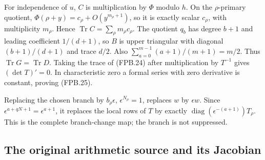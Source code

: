 For independence of \(u\), \(C\) is multiplication by \(\Phi\)
modulo \(h\). On the \(\rho\)-primary quotient,
\(\Phi(\rho+y)=c_\rho+O(y^{m_\rho+1})\), so it is exactly scalar
\(c_\rho\), with multiplicity \(m_\rho\). Hence
\(\operatorname{Tr}C=\sum_\rho m_\rho c_\rho\).
The quotient \(q_b\) has degree \(b+1\) and leading coefficient
\(1/(d+1)\), so \(B\) is upper triangular with diagonal
\((b+1)/(d+1)\) and trace \(d/2\). Also
\(\sum_{a=0}^{m-1}(a+1)/(m+1)=m/2\). Thus
\(\operatorname{Tr}G=\operatorname{Tr}D\).
Taking the trace of (FPB.24) after multiplication by \(T^{-1}\)
gives \((\det T)'=0\). In characteristic zero a formal series with
zero derivative is constant, proving (FPB.25).

Replacing the chosen branch by \(b_\rho\epsilon\),
\(\epsilon^{N_\rho}=1\), replaces \(w\) by \(\epsilon w\).
Since \(\epsilon^{a+qN+1}=\epsilon^{a+1}\), it replaces the local
rows of \(T\) by exactly
\(\operatorname{diag}(\epsilon^{-(a+1)})T_\rho\).
This is the complete branch-change map; the branch is not suppressed.

\subsection{The original arithmetic source and its Jacobian}

